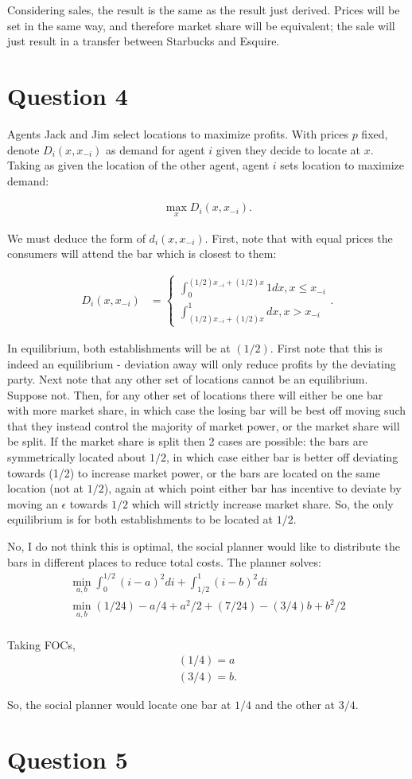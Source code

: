 \documentclass[11pt]{article} %
\begin{document}
Considering sales, the result is the same as the result just derived. Prices will be set in the same way, and therefore market share will be equivalent; the sale will just result in a transfer between Starbucks and Esquire.

\section{Question 4}
Agents Jack and Jim select locations to maximize profits. With prices $p$ fixed, denote $D_i(x,x_{-i})$ as demand for agent $i$ given they decide to locate at $x$. Taking as given the location of the other agent, agent $i$ sets location to maximize demand:

\begin{align*}
\max_{x}D_i(x,x_{-i}).
\end{align*}

We must deduce the form of $d_i(x,x_{-i})$. First, note that with equal prices the consumers will attend the bar which is closest to them:

\begin{align*}
D_i(x,x_{-i}) &= \begin{cases} \int_{0}^{(1/2)x_{-i} + (1/2) x }1 dx, x\leq x_{-i}\\ \int_{(1/2)x_{-i} + (1/2) x }^{1} dx, x>x_{-i}  \end{cases}.
\end{align*}

In equilibrium, both establishments will be at $(1/2)$. First note that this is indeed an equilibrium - deviation away will only reduce profits by the deviating party. Next note that any other set of locations cannot be an equilibrium. Suppose not. Then, for any other set of locations there will either be one bar with more market share, in which case the losing bar will be best off moving such that they instead control the majority of market power, or the market share will be split. If the market share is split then 2 cases are possible: the bars are symmetrically located about $1/2$, in which case either bar is better off deviating towards (1/2) to increase market power, or the bars are located on the same location (not at $1/2$), again at which point either bar has incentive to deviate by moving an $\epsilon$ towards $1/2$ which will strictly increase market share. So, the only equilibrium is for both establishments to be located at $1/2$.

No, I do not think this is optimal, the social planner would like to distribute the bars in different places to reduce total costs. The planner solves:
\begin{align*}
\min_{a,b}\int_{0}^{1/2}(i-a)^2di + \int_{1/2}^1 (i-b)^2 di \\
\min_{a,b}(1/24) - a/4 + a^2/2 + (7/24) - (3/4)b + b^2/2 \\
\end{align*}

Taking FOCs,
\begin{align*}
(1/4) = a \\
(3/4) = b. 
\end{align*}

So, the social planner would locate one bar at $1/4$ and the other at $3/4$.

\section{Question 5}
\end{document}
